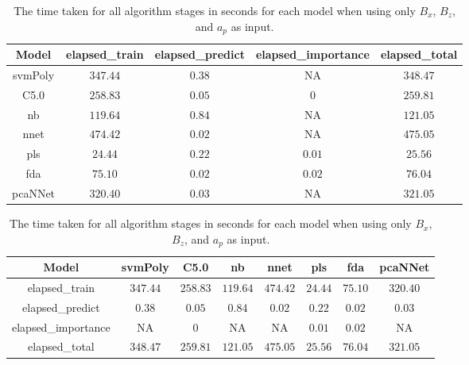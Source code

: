 \begin{table}[!ht]
	\centering
	\begin{tabular}{|c|c|c|c|c|}
		\hline
		Model & elapsed_train & elapsed_predict & elapsed_importance & elapsed_total \\ \hline
		svmPoly & $347.44$ & $0.38$ & NA & $348.47$ \\ \hline
		C5.0 & $258.83$ & $0.05$ & $0$ & $259.81$ \\ \hline
		nb & $119.64$ & $0.84$ & NA & $121.05$ \\ \hline
		nnet & $474.42$ & $0.02$ & NA & $475.05$ \\ \hline
		pls & $24.44$ & $0.22$ & $0.01$ & $25.56$ \\ \hline
		fda & $75.10$ & $0.02$ & $0.02$ & $76.04$ \\ \hline
		pcaNNet & $320.40$ & $0.03$ & NA & $321.05$ \\ \hline
	\end{tabular}
	\caption{The time taken for all algorithm stages in seconds for each model when using only $B_{x}$, $B_{z}$, and $a_{p}$ as input.}
	\label{tab:time:xzap}
\end{table}

\begin{table}[!ht]
	\centering
	\begin{tabular}{|c|c|c|c|c|c|c|c|}
		\hline
		Model & svmPoly & C5.0 & nb & nnet & pls & fda & pcaNNet \\ \hline
		elapsed_train & $347.44$ & $258.83$ & $119.64$ & $474.42$ & $24.44$ & $75.10$ & $320.40$ \\ \hline
		elapsed_predict & $0.38$ & $0.05$ & $0.84$ & $0.02$ & $0.22$ & $0.02$ & $0.03$ \\ \hline
		elapsed_importance & NA & $0$ & NA & NA & $0.01$ & $0.02$ & NA \\ \hline
		elapsed_total & $348.47$ & $259.81$ & $121.05$ & $475.05$ & $25.56$ & $76.04$ & $321.05$ \\ \hline
	\end{tabular}
	\caption{The time taken for all algorithm stages in seconds for each model when using only $B_{x}$, $B_{z}$, and $a_{p}$ as input.}
	\label{tab:time:reverse:xzap}
\end{table}

